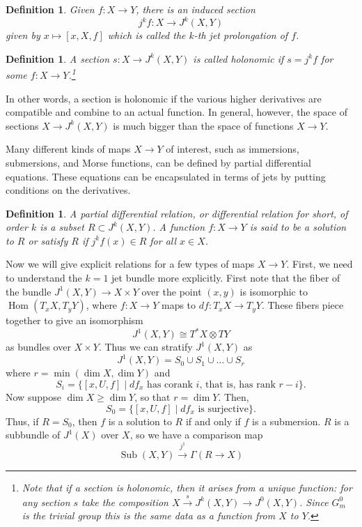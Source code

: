 \documentclass{article}
\newtheorem{definition}[theorem]{Definition}
\newtheorem{proposed work}[theorem]{Proposed Work}
\DeclareMathOperator{\Hom}{Hom}
\DeclareMathOperator{\Sub}{Sub}
\begin{document}
\begin{definition}
Given $f: X \to Y$, there is an induced section 
\[
j^kf: X \to J^k(X,Y)
\]
given by $x \mapsto [x, X, f]$ which is called the \textit{$k$-th jet prolongation} of $f$.
\end{definition}
\begin{definition}
A section $s: X\to J^k(X,Y)$ is called \textit{holonomic} if $s=j^kf$ for some $f:X\to Y$.\footnote{Note that if a section is holonomic, then it arises from a unique function: for any section $s$ take the composition $X \xrightarrow{s} J^k(X,Y) \to J^0(X,Y)$.  Since $G^0_m$ is the trivial group this is the same data as a function from $X$ to $Y$.}
\end{definition}
In other words, a section is holonomic if the various higher derivatives are compatible and combine to an actual function. In general, however, the space of sections $X\to J^k(X,Y)$ is much bigger than the space of functions $X\to Y$.

Many different kinds of maps $X\to Y$ of interest, such as immersions, submersions, and Morse functions, can be defined by partial differential equations. These equations can be encapsulated in terms of jets by putting conditions on the derivatives.
\begin{definition}
A \textit{partial differential relation}, or \textit{differential relation} for short, of order $k$ is a subset $R \subset J^k(X,Y)$.
A function $f:X \to Y$ is said to be a \textit{solution} to $R$ or satisfy $R$ if $j^k f(x) \in R$ for all $x \in X$.
\end{definition}
Now we will give explicit relations for a few types of maps $X\to Y$. First, we need to understand the $k=1$ jet bundle more explicitly. First note that the fiber of the bundle $J^1(X,Y)\to X\times Y$ over the point $(x,y)$ is isomorphic to $\Hom(T_xX, T_yY)$, where $f:X\to Y$ maps to $df: T_xX\to T_yY$. These fibers piece together to give an isomorphism
\[
J^1(X,Y) \cong T^*X\otimes TY
\]
as bundles over $X\times Y$. Thus we can stratify $J^1(X,Y)$ as
\[
J^1(X,Y) = S_0\cup S_1\cup\ldots \cup S_r
\]
where $r=\min(\dim X,\dim Y)$ and
\[
S_i = \{[x,U,f] \mid df_x\text{ has corank }i\text{, that is, has rank }r-i\}.
\]
Now suppose $\dim X\ge \dim Y$, so that $r=\dim Y$. Then, 
\[
S_0 = \{[x,U,f] \mid df_x\text{ is surjective}\}.
\]
Thus, if $R=S_0$, then $f$ is a solution to $R$ if and only if $f$ is a submersion. $R$ is a subbundle of $J^1(X)$ over $X$, so we have a comparison map
$$\Sub(X,Y)\xrightarrow{j^1}\Gamma(R\to X)$$
\end{document}
